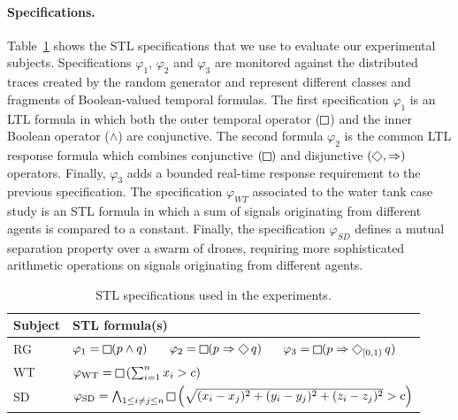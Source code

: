 \paragraph*{Specifications.}
Table~\ref{tab:spec} shows the STL specifications that we use to evaluate our experimental subjects. Specifications $\varphi_{1}$, $\varphi_{2}$ and $\varphi_{3}$ are monitored against the distributed traces created by the random generator and represent different classes and fragments of Boolean-valued temporal formulas. The first specification $\varphi_1$ is an LTL formula in which both the outer temporal operator ($\LTLg$) and the inner Boolean operator ($\wedge$) are conjunctive. The second formula $\varphi_2$ is the common LTL response formula which combines conjunctive $(\LTLg)$ and disjunctive $(\LTLf, \Rightarrow)$ operators. Finally, $\varphi_3$ adds a bounded real-time response requirement to the previous specification. The specification $\varphi_{WT}$ associated to the water tank case study is an STL formula in which a sum of signals originating from different agents is compared to a constant. Finally, the specification $\varphi_{SD}$ defines a mutual separation property over a swarm of drones, requiring more sophisticated arithmetic operations on signals originating from different agents.


\begin{table}[t]
	\centering
		\begin{tabular}{|l|l|}
			\hline
			Subject & STL formula(s) \\
			\hline
			RG & $\varphi_1 =\LTLg (p \wedge q)$ \,\,\,\,\,\, $\varphi_2 = \LTLg (p \Rightarrow \LTLf q)$ \,\,\,\,\,\, $\varphi_3 = \LTLg (p \Rightarrow \LTLf_{[0,1)} q)$ \\
			WT & $\varphi_{\text{WT}} = \LTLg \left(\sum_{i=1}^{n} x_i  > c\right)$  \\
			SD & $\varphi_{\text{SD}} = \bigwedge_{1 \leq i \neq j \leq n} \LTLg \left( \sqrt{(x_i-x_j)^2 + (y_i-y_j)^2 + (z_i-z_j)^2} > c \right)$   \\
			\hline
	\end{tabular}%
	\caption{STL specifications used in the experiments.}
	\label{tab:spec} 
\end{table}


